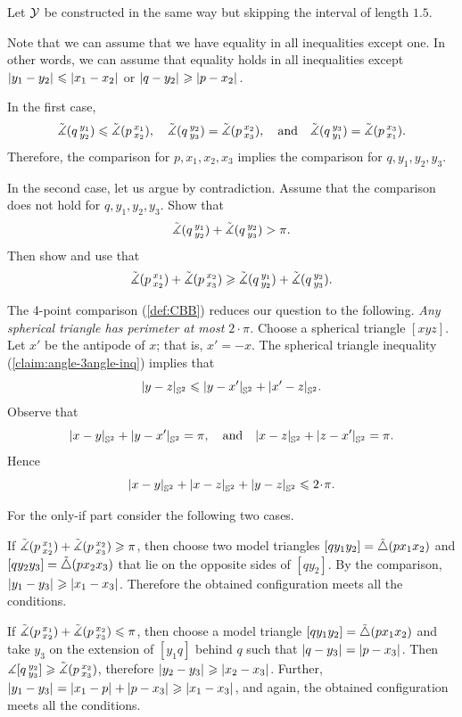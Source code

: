 Let $\mathcal{Y}$ be constructed in the same way but skipping the interval of length $1.5$.

 Note that we can assume that we have equality in all inequalities except one.
In other words, we can assume that equality holds in all inequalities except $\dist{y_1}{y_2}{}\le\dist{x_1}{x_2}{}$ or $\dist{q}{y_2}{}\ge\dist{p}{x_2}{}$.

In the first case,
\[
\tilde\measuredangle(q\,{}^{y_1}_{y_2})\leqslant \tilde\measuredangle(p\,{}^{x_1}_{x_2}),
\quad
\tilde\measuredangle(q\,{}^{y_2}_{y_3})= \tilde\measuredangle(p\,{}^{x_2}_{x_3}),
\quad
\text{and}
\quad
\tilde\measuredangle(q\,{}^{y_3}_{y_1})= \tilde\measuredangle(p\,{}^{x_3}_{x_1}).
\]
Therefore, the comparison for $p,x_1,x_2,x_3$ implies the comparison for $q,y_1,y_2,y_3$.

In the second case, let us argue by contradiction.
Assume that the comparison does not hold for $q,y_1,y_2,y_3$.
Show that
\[\tilde\measuredangle(q\,{}^{y_1}_{y_2})+\tilde\measuredangle(q\,{}^{y_2}_{y_3})> \pi.\]
Then show and use that
\[\tilde\measuredangle(p\,{}^{x_1}_{x_2})+\tilde\measuredangle(p\,{}^{x_2}_{x_3})\geqslant\tilde\measuredangle(q\,{}^{y_1}_{y_2})+\tilde\measuredangle(q\,{}^{y_2}_{y_3}).\]


The 4-point comparison (\ref{def:CBB}) reduces our question to the following.
\textit{Any spherical triangle has perimeter at most $2\cdot\pi$.}
Choose a spherical triangle $[xyz]$.
Let $x'$ be the antipode of $x$; that is, $x'=-x$.
The spherical triangle inequality (\ref{claim:angle-3angle-inq}) implies that
\[\dist{y}{z}{\mathbb{S}^2}\le \dist{y}{x'}{\mathbb{S}^2}+\dist{x'}{z}{\mathbb{S}^2}.\]
Observe that 
\[
\dist{x}{y}{\mathbb{S}^2}+\dist{y}{x'}{\mathbb{S}^2}=\pi,
\quad\text{and}\quad
\dist{x}{z}{\mathbb{S}^2}+\dist{z}{x'}{\mathbb{S}^2}=\pi.
\]
Hence
\[\dist{x}{y}{\mathbb{S}^2}+\dist{x}{z}{\mathbb{S}^2}+\dist{y}{z}{\mathbb{S}^2}\le2\cdot \pi.\]

For the only-if part consider the following two cases.

If $\tilde\measuredangle(p\,{}^{x_1}_{x_2})+\tilde\measuredangle(p\,{}^{x_2}_{x_3})\geqslant \pi$, then choose two model triangles $[qy_1y_2]\z=\modtrig(px_1x_2)$ and $[qy_2y_3]=\tilde\triangle(px_2x_3)$ that lie on the opposite sides of $[qy_2]$.
By the comparison, $\dist{y_1}{y_3}{}\ge \dist{x_1}{x_3}{}$.
Therefore the obtained configuration meets all the conditions.

If $\tilde\measuredangle(p\,{}^{x_1}_{x_2})+\tilde\measuredangle(p\,{}^{x_2}_{x_3})\leqslant \pi$, then choose a model triangle $[qy_1y_2]\z=\modtrig(px_1x_2)$
and take $y_3$ on the extension of $[y_1q]$ behind $q$ such that $\dist{q}{y_3}{}=\dist{p}{x_3}{}$.
Then $\measuredangle [q\,{}^{y_2}_{y_3}]\geqslant \tilde\measuredangle(p\,{}^{x_2}_{x_3})$, therefore $\dist{y_2}{y_3}{}\ge \dist{x_2}{x_3}{}$.
Further, $\dist{y_1}{y_3}{}=\dist{x_1}{p}{}+\dist{p}{x_3}{} \ge \dist{x_1}{x_3}{}$,
and again, the obtained configuration meets all the conditions.

